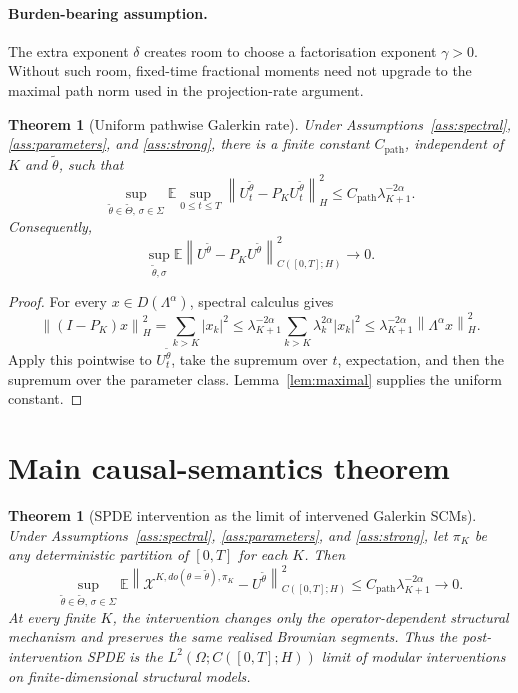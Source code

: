 \documentclass[11pt]{article}
\newtheorem{theorem}[assumption]{Theorem}
\theoremstyle{remark}
\newcommand{\E}{\mathbb E}
\newcommand{\1}{\mathbf 1}
\newcommand{\hnorm}[1]{\left\lVert #1\right\rVert_H}
\newcommand{\cnorm}[1]{\left\lVert #1\right\rVert_{C([0,T];H)}}
\newcommand{\ThetaI}{\widetilde\Theta}
\newcommand{\Lambdaop}{\Lambda}
\begin{document}
\paragraph{Burden-bearing assumption.}
The extra exponent \(\delta\) creates room to choose a factorisation exponent \(\gamma>0\).  Without such room, fixed-time fractional moments need not upgrade to the maximal path norm used in the projection-rate argument.

\begin{theorem}[Uniform pathwise Galerkin rate]\label{thm:path}
Under Assumptions~\ref{ass:spectral}, \ref{ass:parameters}, and \ref{ass:strong}, there is a finite constant \(C_{\mathrm{path}}\), independent of \(K\) and \(\widetilde\theta\), such that
\begin{equation}\label{eq:pathrate}
 \sup_{\widetilde\theta\in\ThetaI,\,\sigma\in\Sigma}
 \E\sup_{0\le t\le T}
 \hnorm{U_t^{\widetilde\theta}-P_KU_t^{\widetilde\theta}}^2
 \le
 C_{\mathrm{path}}\lambda_{K+1}^{-2\alpha}.
\end{equation}
Consequently,
\[
 \sup_{\widetilde\theta,\sigma}
 \E\cnorm{U^{\widetilde\theta}-P_KU^{\widetilde\theta}}^2
 \longrightarrow0.
\]
\end{theorem}

\begin{proof}
For every \(x\in D(\Lambdaop^\alpha)\), spectral calculus gives
\[
 \hnorm{(I-P_K)x}^2
 =\sum_{k>K}|x_k|^2
 \le\lambda_{K+1}^{-2\alpha}
 \sum_{k>K}\lambda_k^{2\alpha}|x_k|^2
 \le\lambda_{K+1}^{-2\alpha}\hnorm{\Lambdaop^\alpha x}^2.
\]
Apply this pointwise to \(U_t^{\widetilde\theta}\), take the supremum over \(t\), expectation, and then the supremum over the parameter class.  Lemma~\ref{lem:maximal} supplies the uniform constant.
\end{proof}

\section{Main causal-semantics theorem}

\begin{theorem}[SPDE intervention as the limit of intervened Galerkin SCMs]\label{thm:semantics}
Under Assumptions~\ref{ass:spectral}, \ref{ass:parameters}, and \ref{ass:strong}, let \(\pi_K\) be any deterministic partition of \([0,T]\) for each \(K\).  Then
\begin{equation}\label{eq:mainsem}
 \sup_{\widetilde\theta\in\ThetaI,\,\sigma\in\Sigma}
 \E\cnorm{
 \mathcal X^{K,do(\theta=\widetilde\theta),\pi_K}
 -U^{\widetilde\theta}
 }^2
 \le C_{\mathrm{path}}\lambda_{K+1}^{-2\alpha}
 \longrightarrow0.
\end{equation}
At every finite \(K\), the intervention changes only the operator-dependent structural mechanism and preserves the same realised Brownian segments.  Thus the post-intervention SPDE is the \(L^2(\Omega;C([0,T];H))\) limit of modular interventions on finite-dimensional structural models.
\end{theorem}
\end{document}
